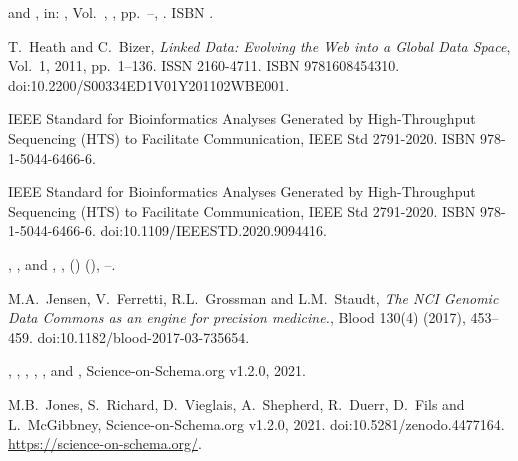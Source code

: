 \documentclass[ds,v1.1.2,openaccess]{iosart2x}%
\begin{document}
\begin{thebibliography}{}
%
\begin{bchapter}
 and
,
in: ,
Vol.~,
,
pp.~--,
.
ISBN .
\end{bchapter}
%
\OrigBibText
T.~Heath and
C.~Bizer,
\textit{Linked Data: Evolving the Web into a Global Data Space},
Vol.~1,
2011,
pp.~1--136.
ISSN 2160-4711.
ISBN 9781608454310.
doi:10.2200/S00334ED1V01Y201102WBE001.
\endOrigBibText
{}
\endbibitem

%
\begin{botherref}
IEEE Standard for Bioinformatics Analyses Generated by High-Throughput
Sequencing (HTS) to Facilitate Communication,
IEEE Std 2791-2020.
ISBN 978-1-5044-6466-6.
\end{botherref}
%
\OrigBibText
IEEE Standard for Bioinformatics Analyses Generated by High-Throughput
Sequencing (HTS) to Facilitate Communication,
IEEE Std 2791-2020.
ISBN 978-1-5044-6466-6.
doi:10.1109/IEEESTD.2020.9094416.
\endOrigBibText
{}
\endbibitem

%
\begin{barticle}
,
,
 and
,
,
()
(),
--.
\end{barticle}
%
\OrigBibText
M.A.~Jensen,
V.~Ferretti,
R.L.~Grossman and
L.M.~Staudt,
\textit{The {NCI} Genomic Data Commons as an engine for precision medicine.},
Blood
130(4)
(2017),
453--459.
doi:10.1182/blood-2017-03-735654.
\endOrigBibText
{}
\endbibitem

%
\begin{botherref}
,
,
,
,
,
 and
,
Science-on-Schema.org v1.2.0, 
2021.
\end{botherref}
%
\OrigBibText
M.B.~Jones,
S.~Richard,
D.~Vieglais,
A.~Shepherd,
R.~Duerr,
D.~Fils and
L.~McGibbney,
Science-on-Schema.org v1.2.0,
2021.
doi:10.5281/zenodo.4477164.
\url{https://science-on-schema.org/}.
\endOrigBibText
{}
\endbibitem


\end{thebibliography}
\end{document}

